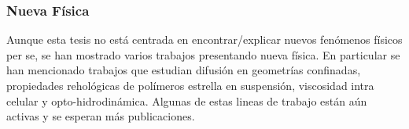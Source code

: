 \documentclass[ twoside,openright,titlepage,numbers=noenddot,%
headinclude,footinclude,cleardoublepage=empty,abstract=on,
BCOR=5mm,paper=b5,fontsize=11pt, dvipsnames
]{scrreprt}
\begin{document}
\subsubsection*{Nueva Física}
Aunque esta tesis no está centrada en encontrar/explicar nuevos fenómenos físicos per se, se han mostrado varios trabajos presentando nueva física. En particular se han mencionado trabajos que estudian difusión en geometrías confinadas, propiedades rehológicas de polímeros estrella en suspensión, viscosidad intra celular y opto-hidrodinámica. Algunas de estas lineas de trabajo están aún activas y se esperan más publicaciones.




\end{document}
